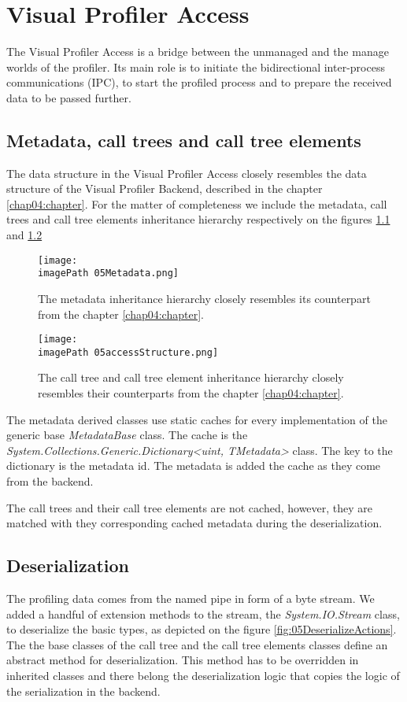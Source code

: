 \chapter{Visual Profiler Access}
The Visual Profiler Access is a bridge between the unmanaged and the manage worlds of the profiler. Its main role is to initiate the bidirectional inter-process communications (IPC), to start the profiled process and to prepare the received data to be passed further.

\section{Metadata, call trees and call tree elements}
The data structure in the Visual Profiler Access closely resembles the data structure of the Visual Profiler Backend, described in the chapter \ref{chap04:chapter}. For the matter of completeness we include the metadata, call trees and call tree elements inheritance hierarchy respectively on the figures \ref{fig:05Metadata} and \ref{fig:05accessStructure}

\begin{figure}
	\centering
		\texttt{[image: \\imagePath 05Metadata.png]}
		\caption{The metadata inheritance hierarchy closely resembles its counterpart from the chapter \ref{chap04:chapter}.}
	\label{fig:05Metadata}
\end{figure}

\begin{figure}
	\centering
		\texttt{[image: \\imagePath 05accessStructure.png]}
		\caption{The call tree and call tree element inheritance hierarchy closely resembles their counterparts from the chapter \ref{chap04:chapter}.}
	\label{fig:05accessStructure}
\end{figure}

The metadata derived classes use static caches for every implementation of the generic base \textit{MetadataBase} class. The cache is the \textit{System.Collections.Generic.Dictionary<uint, TMetadata>} class. The key to the dictionary is the metadata id. The metadata is added the cache as they come from the backend. 

The call trees and their call tree elements are not cached, however, they are matched with they corresponding cached metadata during the deserialization.

\section{Deserialization}
The profiling data comes from the named pipe in form of a byte stream. We added a handful of extension methods to the stream, the \textit{System.IO.Stream} class, to deserialize the basic types, as depicted on the figure \ref{fig:05DeserializeActions}. The the base classes of the call tree and the call tree elements classes define an abstract method for deserialization. This method has to be overridden in inherited classes and there belong the deserialization logic that copies the logic of the serialization in the backend.

